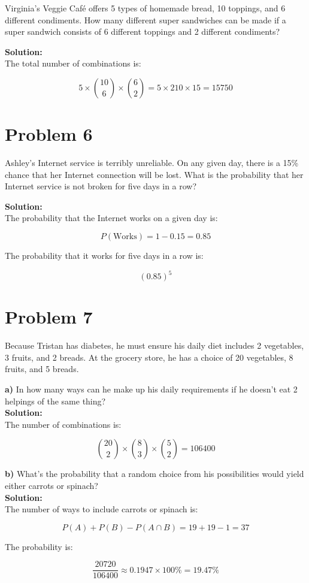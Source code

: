 \documentclass{article}
\begin{document}
Virginia’s Veggie Café offers 5 types of homemade bread, 10 toppings, and 6 different condiments. How many different super sandwiches can be made if a super sandwich consists of 6 different toppings and 2 different condiments?

\textbf{Solution:} \\
The total number of combinations is:

\[
5 \times \binom{10}{6} \times \binom{6}{2} = 5 \times 210 \times 15 = 15750
\]

\section*{Problem 6}

Ashley’s Internet service is terribly unreliable. On any given day, there is a 15\% chance that her Internet connection will be lost. What is the probability that her Internet service is not broken for five days in a row?

\textbf{Solution:} \\
The probability that the Internet works on a given day is:

\[
P(\text{Works}) = 1 - 0.15 = 0.85
\]

The probability that it works for five days in a row is:

\[
(0.85)^5
\]

\section*{Problem 7}

Because Tristan has diabetes, he must ensure his daily diet includes 2 vegetables, 3 fruits, and 2 breads. At the grocery store, he has a choice of 20 vegetables, 8 fruits, and 5 breads.

\textbf{a)} In how many ways can he make up his daily requirements if he doesn’t eat 2 helpings of the same thing?\\
\textbf{Solution:} \\
The number of combinations is:

\[
\binom{20}{2} \times \binom{8}{3} \times \binom{5}{2} = 106400
\]

\textbf{b)} What’s the probability that a random choice from his possibilities would yield either carrots or spinach?\\
\textbf{Solution:} \\
The number of ways to include carrots or spinach is:

\[
P(A) + P(B) - P(A \cap B) = 19 + 19 - 1 = 37
\]

The probability is:

\[
\frac{20720}{106400} \approx 0.1947 \times 100\% = 19.47\%
\]
\end{document}
